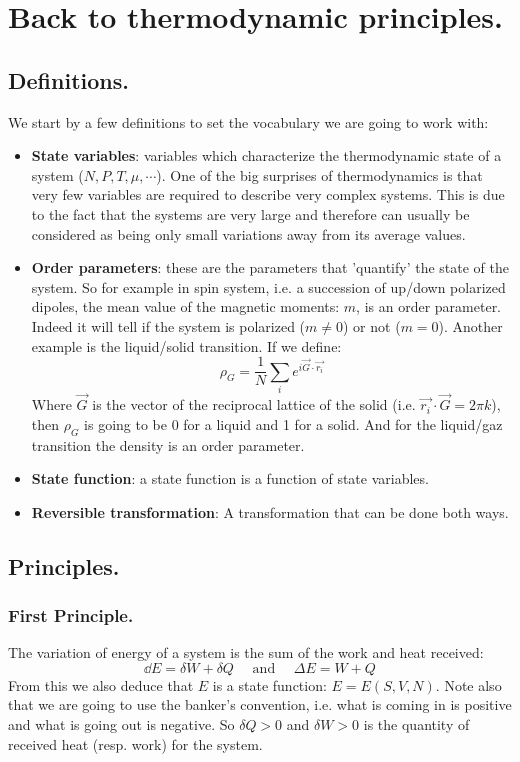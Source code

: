 \documentclass[10pt,a4paper]{book}
\begin{document}
\section{Back to thermodynamic principles.}
\subsection{Definitions.}
We start by a few definitions to set the vocabulary we are going to work with:
\begin{itemize}
\item \textbf{State variables}: variables which characterize the thermodynamic state of a system ($N, P, T, \mu, \cdots$). One of the big surprises of thermodynamics is that very few variables are required to describe very complex systems. This is due to the fact that the systems are very large and therefore can usually be considered as being only small variations away from its average values.
\item \textbf{Order parameters}: these are the parameters that 'quantify' the state of the system. So for example in spin system, i.e. a succession of up/down polarized dipoles, the mean value of the magnetic moments: $m$, is an order parameter. Indeed it will tell if the system is polarized ($m \neq 0$) or not ($m = 0$). Another example is the liquid/solid transition. If we define:
\[
\rho_G = \frac{1}{N}\sum_i e^{i \vec{G} \cdot \vec{r_i}}
\]
Where $\vec{G}$ is the vector of the reciprocal lattice of the solid (i.e. $\vec{r_i}\cdot \vec{G} = 2\pi k$), then $\rho_G$ is going to be 0 for a liquid and 1 for a solid. And for the liquid/gaz transition the density is an order parameter.
\item \textbf{State function}: a state function is a function of state variables.
\item \textbf{Reversible transformation}: A transformation that can be done both ways.
\end{itemize}

\subsection{Principles.}
\subsubsection{First Principle.}
The variation of energy of a system is the sum of the work and heat received:
\[
\dd E = \delta W + \delta Q \quad \text{ and } \quad \Delta E = W +Q
\]
From this we also deduce that $E$ is a state function: $E = E(S, V, N)$. Note also that we are going to use the banker's convention, i.e. what is coming in is positive and what is going out is negative. So $\delta Q > 0$ and $\delta W > 0$ is the quantity of received heat (resp. work) for the system.
\end{document}
